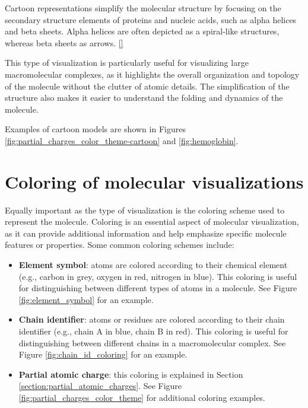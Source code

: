 \documentclass[
  digital,     %
  oneside,     %
  nosansbold,  %
  nocolorbold, %
  lof,         %
  lot,         %
]{fithesis4}
\begin{document}
Cartoon representations simplify the molecular structure by focusing on the secondary structure elements of proteins and nucleic acids, such as alpha helices and beta sheets. Alpha helices are often depicted as a spiral-like structures, whereas beta sheets as arrows. \ref{}

This type of visualization is particularly useful for visualizing large macromolecular complexes, as it highlights the overall organization and topology of the molecule without the clutter of atomic details. The simplification of the structure also makes it easier to understand the folding and dynamics of the molecule. \cite{tsai2003introduction}

Examples of cartoon models are shown in Figures \ref{fig:partial_charges_color_theme-cartoon} and \ref{fig:hemoglobin}.

\section{Coloring of molecular visualizations}
\label{subsection:coloring_of_molecular_visualizations}

Equally important as the type of visualization is the coloring scheme used to represent the molecule. Coloring is an essential aspect of molecular visualization, as it can provide additional information and help emphasize specific molecule features or properties. Some common coloring schemes include:

\begin{itemize}
  \item \textbf{Element symbol}: atoms are colored according to their chemical element (e.g., carbon in grey, oxygen in red, nitrogen in blue). This coloring is useful for distinguishing between different types of atoms in a molecule. See Figure \ref{fig:element_symbol} for an example.
  \item \textbf{Chain identifier}: atoms or residues are colored according to their chain identifier (e.g., chain A in blue, chain B in red). This coloring is useful for distinguishing between different chains in a macromolecular complex. See Figure \ref{fig:chain_id_coloring} for an example.
  \item \textbf{Partial atomic charge}: this coloring is explained in Section \ref{section:partial_atomic_charges}. See Figure \ref{fig:partial_charges_color_theme} for additional coloring examples.
\end{itemize}
\end{document}
